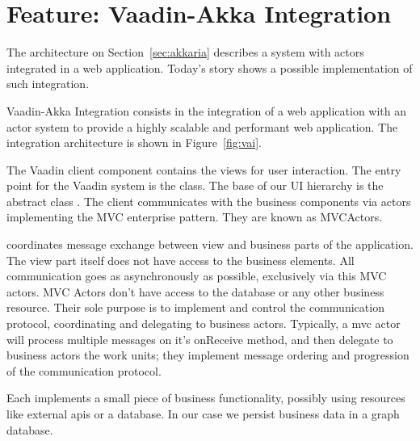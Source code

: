 \section{Feature: Vaadin-Akka Integration}
\label{sec:feature-vai}

The architecture on Section~\ref{sec:akkaria} describes a system with
\akka actors integrated in a \vaadin web application.
%
Today's story shows a possible implementation of such integration.
\begin{feature}
  Vaadin-Akka Integration consists in the integration of a \vaadin web
  application with an \akka actor system to provide a highly scalable
  and performant web application. The integration architecture is
  shown in Figure~\ref{fig:vai}.
%

%
  
%

%
  The Vaadin client component contains the views for user
  interaction. The entry point for the Vaadin system is the 
  class. The base of our UI hierarchy is the abstract class
  .
%
  The client communicates with the business components via actors
  implementing the MVC enterprise pattern. They are known as
  MVCActors.
%

%
   coordinates message exchange between view and
  business parts of the application. The view part itself does not
  have access to the business elements. All communication goes as
  asynchronously as possible, exclusively via this MVC actors.
%
  MVC Actors don't have access to the database or any other business
  resource. Their sole purpose is to implement and control the
  communication protocol, coordinating and delegating to business
  actors.
%
  Typically, a mvc actor will process multiple messages on it's
  onReceive method, and then delegate to business actors the work
  units; they implement message ordering and progression of the
  communication protocol.
%

%
  Each  implements a small piece of business
  functionality, possibly using resources like external apis or a
  database. In our case we persist business data in a graph database.
%








\end{feature}
